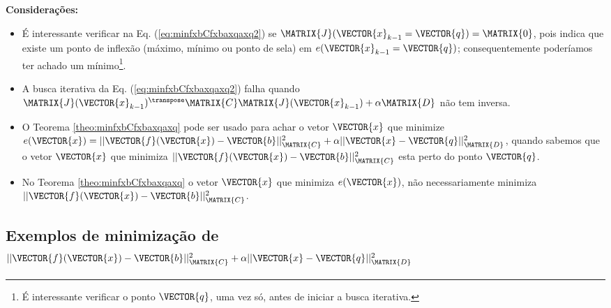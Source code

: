 \begin{theorem}
\textbf{Considerações:}

\begin{itemize}
\item É interessante verificar na Eq. (\ref{eq:minfxbCfxbaxqaxq2}) 
se  $\MATRIX{J}(\VECTOR{x}_{k-1}=\VECTOR{q}) = \MATRIX{0}$,
pois indica que existe um ponto de inflexão 
(máximo, mínimo ou ponto de sela) em $e(\VECTOR{x}_{k-1}=\VECTOR{q})$;
consequentemente poderíamos ter achado um mínimo\footnote{\label{foot:labq}É 
interessante verificar o ponto $\VECTOR{q}$, uma vez só, 
antes de iniciar a busca iterativa.}.
\item A busca iterativa da Eq. (\ref{eq:minfxbCfxbaxqaxq2}) falha quando 
$\MATRIX{J}(\VECTOR{x}_{k-1})^{\transpose}\MATRIX{C} \MATRIX{J}(\VECTOR{x}_{k-1}) +\alpha\MATRIX{D}$
não tem inversa.
\end{itemize}

\end{theorem} 

\begin{tcbattention}
\begin{itemize}
\item O Teorema \ref{theo:minfxbCfxbaxqaxq} pode ser usado para achar o vetor $\VECTOR{x}$
que minimize $e(\VECTOR{x})=||\VECTOR{f}(\VECTOR{x})-\VECTOR{b}||_{\MATRIX{C}}^2+\alpha||\VECTOR{x}-\VECTOR{q}||_{\MATRIX{D}}^2$,
quando sabemos que o vetor $\VECTOR{x}$ que minimiza $||\VECTOR{f}(\VECTOR{x})-\VECTOR{b}||_{\MATRIX{C}}^2$ 
esta perto do ponto $\VECTOR{q}$.
\item No Teorema \ref{theo:minfxbCfxbaxqaxq} o vetor $\VECTOR{x}$ que minimiza $e(\VECTOR{x})$, 
não necessariamente minimiza  $||\VECTOR{f}(\VECTOR{x})-\VECTOR{b}||_{\MATRIX{C}}^2$.
\end{itemize}
\end{tcbattention}

\subsection{Exemplos de minimização de 
$||\VECTOR{f}(\VECTOR{x})-\VECTOR{b}||_{\MATRIX{C}}^2+\alpha||\VECTOR{x}-\VECTOR{q}||_{\MATRIX{D}}^2$}



